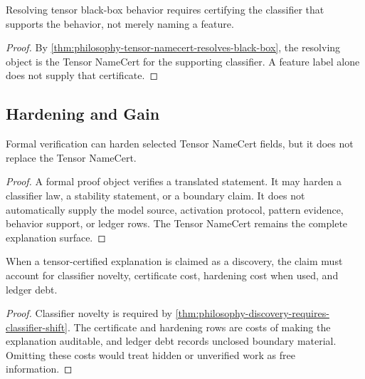 \begin{corollary}
\label{cor:philosophy-black-box-resolution-classifier-certification}
Resolving tensor black-box behavior requires certifying the classifier
that supports the behavior, not merely naming a feature.
\end{corollary}
\begin{proof}
By \autoref{thm:philosophy-tensor-namecert-resolves-black-box}, the
resolving object is the Tensor NameCert for the supporting classifier.
A feature label alone does not supply that certificate.
\end{proof}

\subsection{Hardening and Gain}
\label{subsec:philosophy-tensor-hardening-gain}

\begin{theorem}
\label{thm:philosophy-formal-hardening-not-tensor-namecert}
Formal verification can harden selected Tensor NameCert fields, but it
does not replace the Tensor NameCert.
\end{theorem}
\begin{proof}
A formal proof object verifies a translated statement. It may harden a
classifier law, a stability statement, or a boundary claim. It does not
automatically supply the model source, activation protocol, pattern
evidence, behavior support, or ledger rows. The Tensor NameCert remains
the complete explanation surface.
\end{proof}

\begin{theorem}
\label{thm:philosophy-tensor-explanations-require-net-gain-audit}
When a tensor-certified explanation is claimed as a discovery, the claim
must account for classifier novelty, certificate cost, hardening cost
when used, and ledger debt.
\end{theorem}
\begin{proof}
Classifier novelty is required by
\autoref{thm:philosophy-discovery-requires-classifier-shift}. The
certificate and hardening rows are costs of making the explanation
auditable, and ledger debt records unclosed boundary material. Omitting
these costs would treat hidden or unverified work as free information.
\end{proof}

